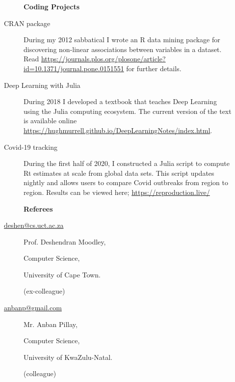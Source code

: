 \documentclass[12pt]{article}
\begin{document}
\newpage
\begin{multicols}{2}

\begin{description}\item[] \begin{description}\item[] {\large \bf  Coding Projects }
\item[CRAN package ]
	During my 2012 sabbatical I wrote an R data mining package for discovering
	non-linear associations between variables in a dataset. Read 
	\url{https://journals.plos.org/plosone/article?id=10.1371/journal.pone.0151551}       
	for further details.
\item[Deep Learning with Julia]
        During 2018 I developed a textbook 
        that teaches Deep Learning using the Julia computing ecosystem. 
        The current version of the text is available online \url{https://hughmurrell.github.io/DeepLearningNotes/index.html}.
\item[Covid-19 tracking ]
	During the first half of 2020, I constructed a Julia script
	to compute Rt estimates at scale from global data sets. This script updates
	nightly and allows users to compare Covid outbreaks from region to region.
	Results can be viewed here; \url{https://reproduction.live/}
 \end{description}
\end{description}


\begin{description}\item[] \begin{description}\item[] {\large \bf  Referees  }

\item[\url{deshen@cs.uct.ac.za}] 
 \item[] Prof. Deshendran Moodley, 
 \item[] Computer Science, 
 \item[] University of Cape Town.
\item[] (ex-colleague)
\item[]

\item[\url{anbanp@gmail.com}] 
 \item[] Mr. Anban Pillay,
 \item[] Computer Science,
 \item[] University of KwaZulu-Natal.
 \item[] (colleague) 
\item[]




\end{description}
\end{description}
\end{multicols}
\end{document}

